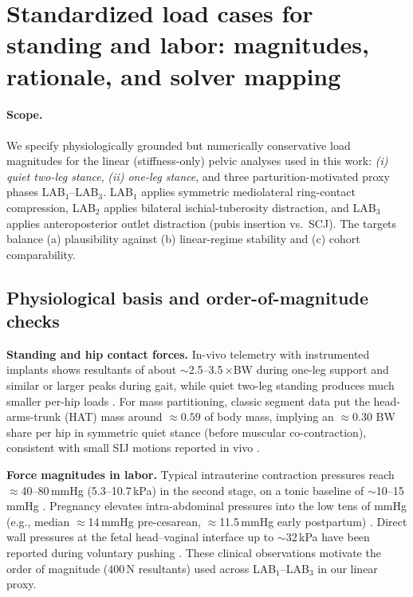 \documentclass[11pt]{article}
\begin{document}
\section{Standardized load cases for standing and labor: magnitudes, rationale, and solver mapping}
\label{sec:standard-loads-en}

\paragraph{Scope.}
We specify physiologically grounded but numerically conservative load magnitudes for the linear (stiffness-only) pelvic analyses used in this work: \emph{(i) quiet two-leg stance}, \emph{(ii) one-leg stance}, and three parturition-motivated proxy phases LAB$_1$--LAB$_3$.
LAB$_1$ applies symmetric mediolateral ring-contact compression, LAB$_2$ applies bilateral ischial-tuberosity distraction, and LAB$_3$ applies anteroposterior outlet distraction (pubis insertion vs.\ SCJ).
The targets balance (a) plausibility against (b) linear-regime stability and (c) cohort comparability.

\subsection{Physiological basis and order-of-magnitude checks}
\label{sec:phys-basis-en}

\textbf{Standing and hip contact forces.}
In-vivo telemetry with instrumented implants shows resultants of about \(\sim\)2.5--3.5\,\(\times\)BW during one-leg support and similar or larger peaks during gait, while quiet two-leg standing produces much smaller per-hip loads \citep{Bergmann2001JBiomech,Kutzner2016PLOS}.
For mass partitioning, classic segment data put the head-arms-trunk (HAT) mass around \(\approx 0.59\) of body mass, implying an \(\approx 0.30\) BW share per hip in symmetric quiet stance (before muscular co-contraction), consistent with small SIJ motions reported in vivo \citep{deLeva1996}.

\textbf{Force magnitudes in labor.}
Typical intrauterine contraction pressures reach \(\approx\)40--80\,mmHg (5.3--10.7\,kPa) in the second stage, on a tonic baseline of \(\sim\)10--15\,mmHg \citep{AJOG2022Uterine,Mosby2012Pocket}.
Pregnancy elevates intra-abdominal pressures into the low tens of mmHg (e.g., median \(\approx\)14\,mmHg pre-cesarean, \(\approx\)11.5\,mmHg early postpartum) \citep{Fuchs2013PLOS,Chun2012IAPReview}.
Direct wall pressures at the fetal head--vaginal interface up to \(\sim\)32\,kPa have been reported during voluntary pushing \citep{BiomechPregnancy2022}. These clinical observations motivate the order of magnitude (400\,N resultants) used across LAB$_1$--LAB$_3$ in our linear proxy.
\end{document}
